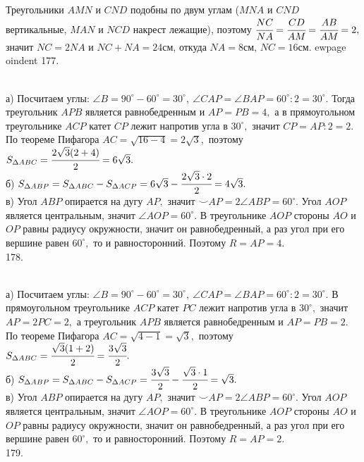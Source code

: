 Треугольники $AMN$ и $CND$ подобны по двум углам ($MNA$ и $CND$ вертикальные, $MAN$ и $NCD$ накрест лежащие), поэтому $\cfrac{NC}{NA}=\cfrac{CD}{AM}=\cfrac{AB}{AM}=2,$ значит $NC=2NA$ и $NC+NA=24$см, откуда $NA=8$см, $NC=16$см.
ewpage
oindent
177. \begin{figure}[ht!]
\end{figure}\\
а) Посчитаем углы: $\angle B=90^\circ-60^\circ=30^\circ,\ \angle CAP=\angle BAP=60^\circ:2=30^\circ.$ Тогда треугольник $APB$ является равнобедренным и $AP=PB=4,$ а в прямоугольном треугольнике $ACP$ катет $CP$ лежит напротив угла в $30^\circ,$ значит $CP=AP:2=2.$ По теореме Пифагора $AC=\sqrt{16-4}=2\sqrt{3},$ поэтому $S_{\Delta ABC}=\cfrac{2\sqrt{3}(2+4)}{2}=6\sqrt{3}.$\\
б) $S_{\Delta ABP}=S_{\Delta ABC}-S_{\Delta ACP}=6\sqrt{3}-\cfrac{2\sqrt{3}\cdot2}{2}=4\sqrt{3}.$\\
в) Угол $ABP$ опирается на дугу $AP,$ значит $\smile AP=2\angle ABP=60^\circ.$ Угол $AOP$ является центральным, значит $\angle AOP=60^\circ.$ В треугольнике $AOP$ стороны $AO$ и $OP$ равны радиусу окружности, значит он равнобедренный, а раз угол при его вершине равен $60^\circ,$ то и равносторонний. Поэтому $R=AP=4.$\\
178. \begin{figure}[ht!]
\end{figure}\\
а) Посчитаем углы: $\angle B=90^\circ-60^\circ=30^\circ,\ \angle CAP=\angle BAP=60^\circ:2=30^\circ.$ В прямоугольном треугольнике $ACP$ катет $PC$ лежит напротив угла в $30^\circ,$ значит $AP=2PC=2,$ а треугольник $APB$ является равнобедренным и $AP=PB=2.$ По теореме Пифагора $AC=\sqrt{4-1}=\sqrt{3},$ поэтому $S_{\Delta ABC}=\cfrac{\sqrt{3}(1+2)}{2}=\cfrac{3\sqrt{3}}{2}.$\\
б) $S_{\Delta ABP}=S_{\Delta ABC}-S_{\Delta ACP}=\cfrac{3\sqrt{3}}{2}-\cfrac{\sqrt{3}\cdot1}{2}=\sqrt{3}.$\\
в) Угол $ABP$ опирается на дугу $AP,$ значит $\smile AP=2\angle ABP=60^\circ.$ Угол $AOP$ является центральным, значит $\angle AOP=60^\circ.$ В треугольнике $AOP$ стороны $AO$ и $OP$ равны радиусу окружности, значит он равнобедренный, а раз угол при его вершине равен $60^\circ,$ то и равносторонний. Поэтому $R=AP=2.$\\
179. \begin{figure}[ht!]
\end{figure}\\
